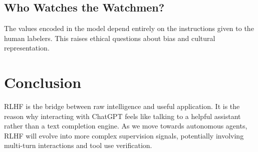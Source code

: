 \subsection{Who Watches the Watchmen?}
The values encoded in the model depend entirely on the instructions given to the human labelers. This raises ethical questions about bias and cultural representation.

\section{Conclusion}

RLHF is the bridge between raw intelligence and useful application. It is the reason why interacting with ChatGPT feels like talking to a helpful assistant rather than a text completion engine. As we move towards autonomous agents, RLHF will evolve into more complex supervision signals, potentially involving multi-turn interactions and tool use verification.
